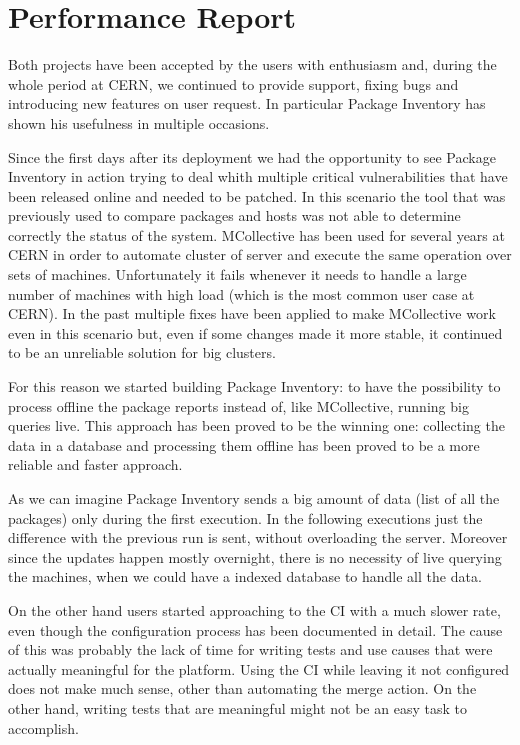 \section{Performance Report}

Both projects have been accepted by the users with enthusiasm and, during
the whole period at CERN, we continued to provide support, fixing bugs and
introducing new features on user request. In particular Package Inventory
has shown his usefulness in multiple occasions.

Since the first days after its deployment we had the opportunity to see
Package Inventory in action trying to deal whith multiple critical
vulnerabilities that have been released online and needed to be patched.
In this scenario the tool that was previously used to compare packages and
hosts was not able to determine correctly the status of the system.
MCollective has been used for several years at CERN in order to automate
cluster of server and execute the same operation over sets of machines.
Unfortunately it fails whenever it needs to handle a large number of
machines with high load (which is the most common user case at CERN). In
the past multiple fixes have been applied to make MCollective work even in
this scenario but, even if some changes made it more stable, it continued
to be an unreliable solution for big clusters.

For this reason we started building Package Inventory: to have the
possibility to process offline the package reports instead of, like
MCollective, running big queries live. This approach has been proved to be
the winning one: collecting the data in a database and processing them
offline has been proved to be a more reliable and faster approach.

As we can imagine Package Inventory sends a big amount of data (list of
all the packages) only during the first execution. In the following
executions just the difference with the previous run is sent, without
overloading the server. Moreover since the updates happen mostly
overnight, there is no necessity of live querying the machines, when we
could have a indexed database to handle all the data.

On the other hand users started approaching to the CI with a much slower
rate, even though the configuration process has been documented in detail.
The cause of this was probably the lack of time for writing tests and use
causes that were actually meaningful for the platform. Using the CI while
leaving it not configured does not make much sense, other than automating
the merge action. On the other hand, writing tests that are meaningful
might not be an easy task to accomplish. 
